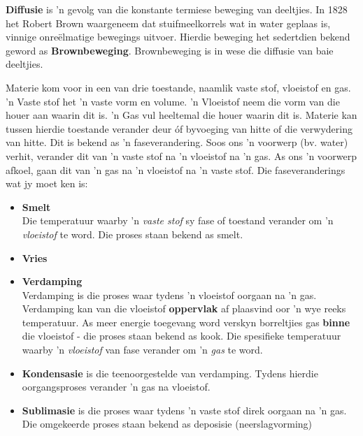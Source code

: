 \par 
\label{m38736*id10987324}\textbf{Diffusie} is 'n gevolg van die konstante termiese beweging van deeltjies. In 1828 het Robert Brown waargeneem dat stuifmeelkorrels wat in water geplaas is, vinnige onreëlmatige bewegings uitvoer. Hierdie beweging het sedertdien bekend geword as \textbf{Brownbeweging}. Brownbeweging is in wese die diffusie van baie deeltjies.
\par 
\label{m38736*id48327}Materie kom voor in een van drie toestande, naamlik vaste stof, vloeistof en gas. 'n Vaste stof het 'n vaste vorm en volume. 'n Vloeistof neem die vorm van die houer aan waarin dit is. 'n Gas vul heeltemal die houer waarin dit is. Materie kan tussen hierdie toestande verander deur óf byvoeging van hitte of die verwydering van hitte. Dit is bekend as 'n faseverandering. Soos ons 'n voorwerp (bv. water) verhit, verander dit van 'n vaste stof na 'n vloeistof na 'n gas. As ons 'n voorwerp afkoel, gaan dit van 'n gas na 'n vloeistof na 'n vaste stof. Die faseveranderings wat jy moet ken is:
\label{m38736*id02341}\begin{itemize}[noitemsep]
\item \textbf{Smelt} \\ 
 { \label{m38734*meaningfhsst!!!underscore!!!id276}
Die temperatuur waarby 'n \textsl{vaste stof} sy fase of toestand verander om 'n \textsl{vloeistof} te word. Die proses staan bekend as smelt. } 
\item \textbf{Vries} \\
\item \textbf{Verdamping} \\
Verdamping is die proses waar tydens 'n vloeistof oorgaan na 'n gas. Verdamping kan van die vloeistof \textbf{oppervlak} af plaasvind oor 'n wye reeks temperatuur. As meer energie toegevang word verskyn borreltjies gas \textbf{binne} die vloeistof - die proses staan bekend as kook.
 { \label{m38734*meaningfhsst!!!underscore!!!id282}
Die spesifieke temperatuur waarby 'n \textsl{vloeistof} van fase verander om 'n \textsl{gas} te word.} 
\item \textbf{Kondensasie} is die teenoorgestelde van verdamping. Tydens hierdie oorgangsproses verander 'n gas na vloeistof.
\item \textbf{Sublimasie} is die proses waar tydens 'n vaste stof direk oorgaan na 'n gas. Die omgekeerde proses staan bekend as deposisie (neerslagvorming)\end{itemize}
